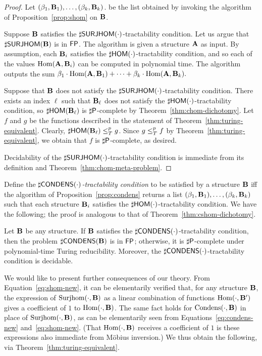 \documentclass[11pt]{article}
\begin{document}
\begin{proof}
Let
$(\beta_1,\mathbf{B}_1),\ldots,(\beta_k,\mathbf{B}_k)$.
be the list obtained by invoking the algorithm of
Proposition~\ref{prop:shom} on $\mathbf{B}$.

Suppose $\mathbf{B}$ satisfies the $\sharp\mathsf{SURJHOM}(\cdot)$-tractability condition.
Let us argue that $\sharp\mathsf{SURJHOM}(\mathbf{B})$ is in $\mathsf{FP}$.
The algorithm is given a structure $\mathbf{A}$ as input.
By assumption, each $\mathbf{B}_i$ satisfies the 
$\sharp\mathsf{HOM}(\cdot)$-tractability condition,
and so each of the values $\mathrm{Hom}(\mathbf{A},\mathbf{B}_i)$ can be computed
in polynomial time.
The algorithm outputs the sum 
$\beta_1 \cdot \mathrm{Hom}(\mathbf{A},\mathbf{B}_1)
+ \cdots + 
\beta_k \cdot \mathrm{Hom}(\mathbf{A},\mathbf{B}_k).$

Suppose that $\mathbf{B}$ does not satisfy 
the $\sharp\mathsf{SURJHOM}(\cdot)$-tractability condition.
There exists an index $\ell$ such that $\mathbf{B}_\ell$
does not satisfy 
the $\sharp\mathsf{HOM}(\cdot)$-tractability condition,
so $\sharp\mathsf{HOM}(\mathbf{B}_\ell)$ is $\mathsf{\sharp P}$-complete by
Theorem~\ref{thm:chom-dichotomy}.
Let $f$ and $g$ be the functions described in the statement of
Theorem~\ref{thm:turing-equivalent}.
Clearly,  $\sharp\mathsf{HOM}(\mathbf{B}_\ell) \leq_T^p g$.
Since $g \leq_T^p f$ by
Theorem~\ref{thm:turing-equivalent},
we obtain that $f$ is $\mathsf{\sharp P}$-complete, as desired.


Decidability of
the $\sharp\mathsf{SURJHOM}(\cdot)$-tractability condition 
is immediate from its definition and Theorem~\ref{thm:chom-meta-problem}.
\end{proof}


Define the \emph{$\sharp\mathsf{CONDENS}(\cdot)$-tractability condition} to
be satisfied by a structure $\mathbf{B}$ iff the algorithm of
Proposition~\ref{prop:condens} returns a list
$(\beta_1,\mathbf{B}_1),\ldots,(\beta_k,\mathbf{B}_k)$
such that each structure $\mathbf{B}_i$ satisfies the
$\sharp\mathsf{HOM}(\cdot)$-tractability condition.
We have the following; the proof is analogous to that of
Theorem~\ref{thm:cshom-dichotomy}.

\begin{theorem}
Let $\mathbf{B}$ be any structure.
If $\mathbf{B}$ satisfies the $\sharp\mathsf{CONDENS}(\cdot)$-tractability condition,
then the problem $\sharp\mathsf{CONDENS}(\mathbf{B})$ is in $\mathsf{FP}$;
otherwise, it is $\mathsf{\sharp P}$-complete under polynomial-time Turing 
reducibility.
Moreover, the $\sharp\mathsf{CONDENS}(\cdot)$-tractability condition is decidable.
\end{theorem}

We would like to present further consequences of our theory.
From Equation~\ref{eq:shom-new}, it can be elementarily verified
that, for any structure $\mathbf{B}$, the expression 
of $\mathrm{Surjhom}(\cdot,\mathbf{B})$ as a linear combination of
functions $\mathrm{Hom}(\cdot,\mathbf{B}')$ gives a coefficient of $1$
to $\mathrm{Hom}(\cdot,\mathbf{B})$.
The same fact holds for $\mathrm{Condens}(\cdot,\mathbf{B})$ in place of
$\mathrm{Surjhom}(\cdot,\mathbf{B})$, as can be elementarily seen
from Equations~\ref{eq:condens-new} and~\ref{eq:shom-new}.
(That $\mathrm{Hom}(\cdot,\mathbf{B})$ receives a coefficient of $1$
is these expressions also immediate from M\"obius inversion.)
We thus obtain the following, via Theorem~\ref{thm:turing-equivalent}.
\end{document}

